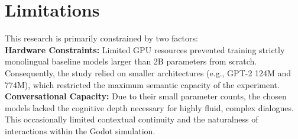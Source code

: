 \section*{Limitations}
\label{sec:limitations}

This research is primarily constrained by two factors:\\

\textbf{Hardware Constraints:} Limited GPU resources prevented training strictly monolingual baseline models larger than 2B parameters from scratch. Consequently, the study relied on smaller architectures (e.g., GPT-2 124M and 774M), which restricted the maximum semantic capacity of the experiment.\\

\textbf{Conversational Capacity:} Due to their small parameter counts, the chosen models lacked the cognitive depth necessary for highly fluid, complex dialogues. This occasionally limited contextual continuity and the naturalness of interactions within the Godot simulation.